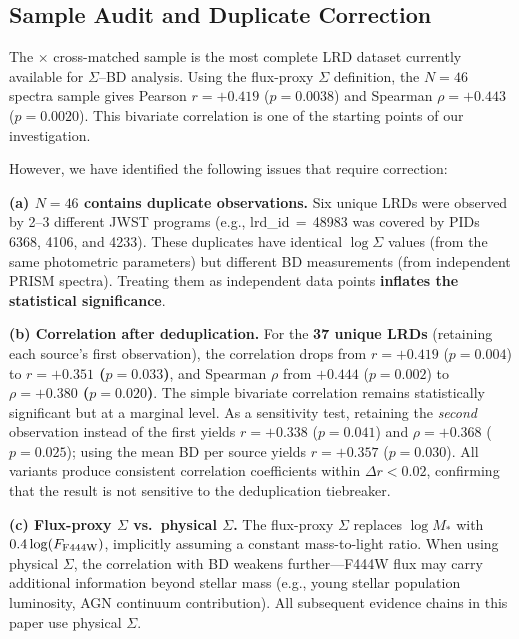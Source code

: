 \documentclass[twocolumn,linenumbers]{aastex631}
\begin{document}
\subsection{Sample Audit and Duplicate Correction}

The \citet{deGraaff2025} $\times$ \citet{Kokorev2024} cross-matched sample is the most complete LRD dataset currently available for $\Sigma$--BD analysis. Using the flux-proxy $\Sigma$ definition, the $N=46$ spectra sample gives Pearson $r = +0.419$ ($p = 0.0038$) and Spearman $\rho = +0.443$ ($p = 0.0020$). This bivariate correlation is one of the starting points of our investigation.

However, we have identified the following issues that require correction:

\textbf{(a) $N=46$ contains duplicate observations.} Six unique LRDs were observed by 2--3 different JWST programs (e.g., lrd\_id\,$=$\,48983 was covered by PIDs 6368, 4106, and 4233). These duplicates have identical $\log\Sigma$ values (from the same photometric parameters) but different BD measurements (from independent PRISM spectra). Treating them as independent data points \textbf{inflates the statistical significance}.

\textbf{(b) Correlation after deduplication.} For the \textbf{37 unique LRDs} (retaining each source's first observation), the correlation drops from $r = +0.419$ ($p = 0.004$) to \textbf{$r = +0.351$ ($p = 0.033$)}, and Spearman $\rho$ from $+0.444$ ($p = 0.002$) to \textbf{$\rho = +0.380$ ($p = 0.020$)}. The simple bivariate correlation remains statistically significant but at a marginal level. As a sensitivity test, retaining the \textit{second} observation instead of the first yields $r = +0.338$ ($p = 0.041$) and $\rho = +0.368$ ($p = 0.025$); using the mean BD per source yields $r = +0.357$ ($p = 0.030$). All variants produce consistent correlation coefficients within $\Delta r < 0.02$, confirming that the result is not sensitive to the deduplication tiebreaker.

\textbf{(c) Flux-proxy $\Sigma$ vs.\ physical $\Sigma$.} The flux-proxy $\Sigma$ replaces $\log M_*$ with $0.4\log(F_{\rm F444W})$, implicitly assuming a constant mass-to-light ratio. When using physical $\Sigma$, the correlation with BD weakens further---F444W flux may carry additional information beyond stellar mass (e.g., young stellar population luminosity, AGN continuum contribution). All subsequent evidence chains in this paper use physical $\Sigma$.
\end{document}
